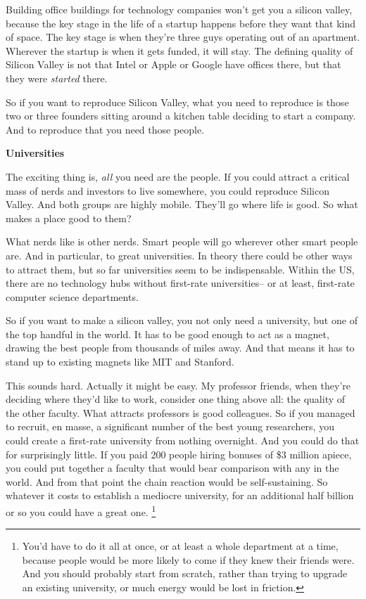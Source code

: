 Building office buildings for technology companies won't get you a
silicon valley, because the key stage in the life of a startup happens
before they want that kind of space. The key stage is when they're three
guys operating out of an apartment. Wherever the startup is when it gets
funded, it will stay. The defining quality of Silicon Valley is not that
Intel or Apple or Google have offices there, but that they were
\emph{started} there.

So if you want to reproduce Silicon Valley, what you need to reproduce
is those two or three founders sitting around a kitchen table deciding
to start a company. And to reproduce that you need those people.

\textbf{Universities}

The exciting thing is, \emph{all} you need are the people. If you could
attract a critical mass of nerds and investors to live somewhere, you
could reproduce Silicon Valley. And both groups are highly mobile.
They'll go where life is good. So what makes a place good to them?

What nerds like is other nerds. Smart people will go wherever other
smart people are. And in particular, to great universities. In theory
there could be other ways to attract them, but so far universities seem
to be indispensable. Within the US, there are no technology hubs without
first-rate universities-- or at least, first-rate computer science
departments.

So if you want to make a silicon valley, you not only need a university,
but one of the top handful in the world. It has to be good enough to act
as a magnet, drawing the best people from thousands of miles away. And
that means it has to stand up to existing magnets like MIT and Stanford.

This sounds hard. Actually it might be easy. My professor friends, when
they're deciding where they'd like to work, consider one thing above
all: the quality of the other faculty. What attracts professors is good
colleagues. So if you managed to recruit, en masse, a significant number
of the best young researchers, you could create a first-rate university
from nothing overnight. And you could do that for surprisingly little.
If you paid 200 people hiring bonuses of \$3 million apiece, you could
put together a faculty that would bear comparison with any in the world.
And from that point the chain reaction would be self-sustaining. So
whatever it costs to establish a mediocre university, for an additional
half billion or so you could have a great one. \footnote{You'd have to do it all at once, or at least a whole department
at a time, because people would be more likely to come if they knew
their friends were. And you should probably start from scratch, rather
than trying to upgrade an existing university, or much energy would be
lost in friction.}

